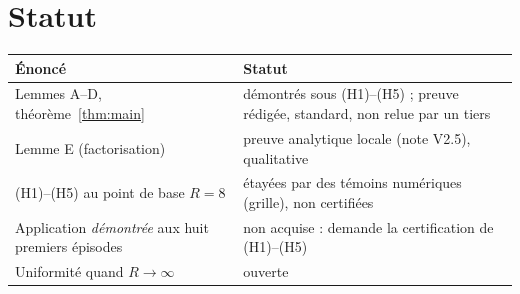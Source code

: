 \documentclass[11pt,a4paper]{article}
\theoremstyle{remark}
\begin{document}
\section{Statut}
\begin{center}\small
\begin{tabular}{p{7.4cm}p{7.4cm}}
\toprule
\'Enonc\'e & Statut\\
\midrule
Lemmes A--D, th\'eor\`eme~\ref{thm:main} & d\'emontr\'es sous (H1)--(H5) ; preuve r\'edig\'ee, standard, non relue par un tiers\\
Lemme E (factorisation) & preuve analytique locale (note V2.5), qualitative\\
(H1)--(H5) au point de base $R=8$ & \'etay\'ees par des t\'emoins num\'eriques (grille), non certifi\'ees\\
Application \emph{d\'emontr\'ee} aux huit premiers \'episodes & non acquise : demande la certification de (H1)--(H5)\\
Uniformit\'e quand $R\to\infty$ & ouverte\\
\bottomrule
\end{tabular}
\end{center}
\end{document}
